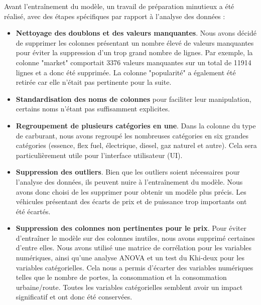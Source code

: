 \documentclass[12pt]{report}
\begin{document}
Avant l'entraînement du modèle, un travail de préparation minutieux a été réalisé, avec des étapes spécifiques par rapport à l'analyse des données :
\begin{itemize}
    \item \textbf{Nettoyage des doublons et des valeurs manquantes}. Nous avons décidé de supprimer les colonnes présentant un nombre élevé de valeurs manquantes pour éviter la suppression d'un trop grand nombre de lignes. Par exemple, la colonne "market" comportait 3376 valeurs manquantes sur un total de 11914 lignes et a donc été supprimée. La colonne "popularité" a également été retirée car elle n'était pas pertinente pour la suite.
    \item \textbf{Standardisation des noms de colonnes} pour faciliter leur manipulation, certains noms n'étant pas suffisamment explicites.
    \item \textbf{Regroupement de plusieurs catégories en une}. Dans la colonne du type de carburant, nous avons regroupé les nombreuses catégories en six grandes catégories (essence, flex fuel, électrique, diesel, gaz naturel et autre). Cela sera particulièrement utile pour l'interface utilisateur (UI).
    \item \textbf{Suppression des outliers}. Bien que les outliers soient nécessaires pour l'analyse des données, ils peuvent nuire à l'entraînement du modèle. Nous avons donc choisi de les supprimer pour obtenir un modèle plus précis. Les véhicules présentant des écarts de prix et de puissance trop importants ont été écartés.
    \item \textbf{Suppression des colonnes non pertinentes pour le prix}. Pour éviter d'entraîner le modèle sur des colonnes inutiles, nous avons supprimé certaines d'entre elles. Nous avons utilisé une matrice de corrélation pour les variables numériques, ainsi qu'une analyse ANOVA et un test du Khi-deux pour les variables catégorielles. Cela nous a permis d'écarter des variables numériques telles que le nombre de portes, la consommation et la consommation urbaine/route. Toutes les variables catégorielles semblent avoir un impact significatif et ont donc été conservées.
\end{itemize}
\end{document}
